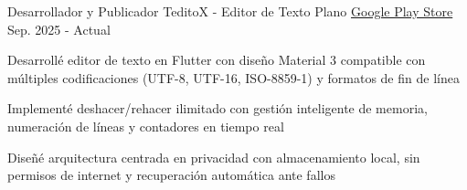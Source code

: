 \begin{cventries}
  \cventry
    {Desarrollador y Publicador} %
    {TeditoX - Editor de Texto Plano} %
    {\href{https://play.google.com/store/apps/details?id=org.zp1ke.teditox}{Google Play Store}} %
    {Sep. 2025 - Actual} %
    {
      \begin{cvitems} %
        \item {Desarrollé editor de texto en Flutter con diseño Material 3 compatible con múltiples codificaciones (UTF-8, UTF-16, ISO-8859-1) y formatos de fin de línea}
        \item {Implementé deshacer/rehacer ilimitado con gestión inteligente de memoria, numeración de líneas y contadores en tiempo real}
        \item {Diseñé arquitectura centrada en privacidad con almacenamiento local, sin permisos de internet y recuperación automática ante fallos}
      \end{cvitems}
    }


\end{cventries}
